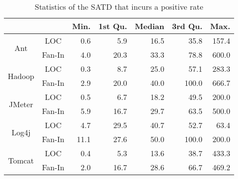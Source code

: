 \begin{table}[tb]
  \caption{Statistics of the SATD that incurs a positive rate }
  \label{tab:statistic}
  \centering

  \begin{tabular}{cc|rrrrr}
  \hline
      &  & \textbf{Min.} & \textbf{1st Qu.} & \textbf{Median} & \textbf{3rd Qu.} & \textbf{Max.} \\
  \hline
\multirow{2}{*}{Ant} &    LOC  & 0.6 &  5.9  &  16.5  &  35.8  &  157.4 \\
                     & Fan-In  & 4.0 & 20.3  &  33.3  &  78.8  &  600.0 \\
  \hline
\multirow{2}{*}{Hadoop} & LOC  & 0.3 &  8.7  &  25.0  &   57.1 &  283.3 \\
                     & Fan-In  & 2.9 & 20.0  &  40.0  &  100.0 &  666.7 \\
  \hline
\multirow{2}{*}{JMeter} & LOC  & 0.5 &  6.7  &  18.2  &   49.5 &  200.0 \\
                     & Fan-In  & 5.9 & 16.7  &  29.7  &   63.5 &  500.0 \\
  \hline
\multirow{2}{*}{Log4j} &  LOC  &  4.7 &  29.5 &  40.7  &   52.7 &   63.4 \\
                     & Fan-In  & 11.1 &  27.6 &  50.0  &  100.0 &  200.0 \\
  \hline
\multirow{2}{*}{Tomcat} & LOC  & 0.4 &  5.3  &  13.6  &   38.7 &  433.3 \\
                     & Fan-In  & 2.0 & 16.7  &  28.6  &   66.7 &  469.2 \\
  \hline
  \end{tabular}
\end{table}